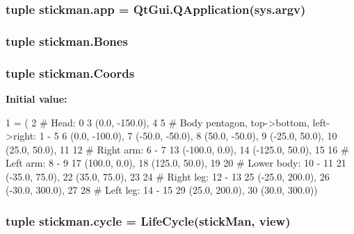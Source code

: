 \subsubsection[{app}]{\setlength{\rightskip}{0pt plus 5cm}tuple stickman.\+app = Qt\+Gui.\+Q\+Application(sys.\+argv)}\label{namespacestickman_a7a6768c8c5fa928570f79e25a6f23498}
\hypertarget{namespacestickman_ac04f7c67fc601ea018a0d7a134680432}{}
\subsubsection[{Bones}]{\setlength{\rightskip}{0pt plus 5cm}tuple stickman.\+Bones}\label{namespacestickman_ac04f7c67fc601ea018a0d7a134680432}
\hypertarget{namespacestickman_a91345d1dd0e2be6b1befb5e313110484}{}
\subsubsection[{Coords}]{\setlength{\rightskip}{0pt plus 5cm}tuple stickman.\+Coords}\label{namespacestickman_a91345d1dd0e2be6b1befb5e313110484}
{\bfseries Initial value\+:}
\begin{DoxyCode}
1 = (
2     \textcolor{comment}{# Head: 0}
3     (0.0, -150.0),
4 
5     \textcolor{comment}{# Body pentagon, top->bottom, left->right: 1 - 5}
6     (0.0, -100.0),
7     (-50.0, -50.0),
8     (50.0, -50.0),
9     (-25.0, 50.0),
10     (25.0, 50.0),
11 
12     \textcolor{comment}{# Right arm: 6 - 7}
13     (-100.0, 0.0),
14     (-125.0, 50.0),
15 
16     \textcolor{comment}{# Left arm: 8 - 9}
17     (100.0, 0.0),
18     (125.0, 50.0),
19 
20     \textcolor{comment}{# Lower body: 10 - 11}
21     (-35.0, 75.0),
22     (35.0, 75.0),
23 
24     \textcolor{comment}{# Right leg: 12 - 13}
25     (-25.0, 200.0),
26     (-30.0, 300.0),
27 
28     \textcolor{comment}{# Left leg: 14 - 15}
29     (25.0, 200.0),
30     (30.0, 300.0))
\end{DoxyCode}
\hypertarget{namespacestickman_a5715a748a28470f614e05a26d1c7bc4c}{}
\subsubsection[{cycle}]{\setlength{\rightskip}{0pt plus 5cm}tuple stickman.\+cycle = {\bf Life\+Cycle}({\bf stick\+Man}, {\bf view})}\label{namespacestickman_a5715a748a28470f614e05a26d1c7bc4c}
\hypertarget{namespacestickman_ac4826e705d36794cd0b5e270df055801}{}
